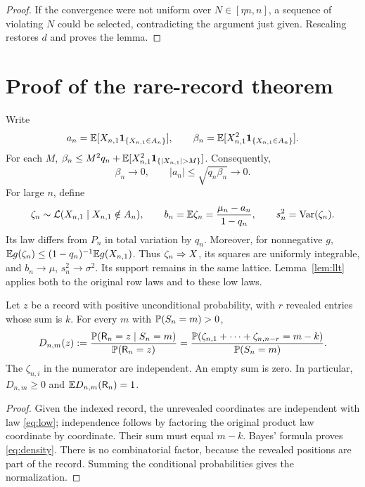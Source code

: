 \begin{proof}
If the convergence were not uniform over $N\in[\eta n,n]$, a sequence of violating $N$ could be selected, contradicting the argument just given. Rescaling restores $d$ and proves the lemma.
\end{proof}

\section{Proof of the rare-record theorem}\label{sec:proof}
Write
\begin{equation}\label{eq:tailmoments}
 a_n=\mathbb E[X_{n,1}\mathbf 1_{\{X_{n,1}\in A_n\}}],\qquad
 \beta_n=\mathbb E[X_{n,1}^2\mathbf 1_{\{X_{n,1}\in A_n\}}].
\end{equation}
For each $M$, $\beta_n\le M^2q_n+\E[X_{n,1}^2\ind_{\{|X_{n,1}|>M\}}]$. Consequently,
\begin{equation}\label{eq:betazero}
 \beta_n\to0,\qquad |a_n|\le\sqrt{q_n\beta_n}\to0.
\end{equation}
For large $n$, define
\begin{equation}\label{eq:low}
 \zeta_n\sim\mathcal L(X_{n,1}\mid X_{n,1}\notin A_n),\qquad
 b_n=\mathbb E\zeta_n=\frac{\mu_n-a_n}{1-q_n},\qquad
 s_n^2=\operatorname{Var}(\zeta_n).
\end{equation}
Its law differs from $P_n$ in total variation by $q_n$. Moreover, for nonnegative $g$,
$\mathbb E g(\zeta_n)\le(1-q_n)^{-1}\mathbb E g(X_{n,1})$. Thus $\zeta_n\mathrel{\Rightarrow} X$, its squares are uniformly integrable, and $b_n\to\mu$, $s_n^2\to\sigma^2$. Its support remains in the same lattice. Lemma~\ref{lem:llt} applies both to the original row laws and to these low laws.

\begin{lemma}\label{lem:density}
Let $z$ be a record with positive unconditional probability, with $r$ revealed entries whose sum is $k$. For every $m$ with $\mathbb P(S_n=m)>0$,
\begin{equation}\label{eq:density}
 D_{n,m}(z):=\frac{\mathbb P(\mathsf R_n=z\mid S_n=m)}{\mathbb P(\mathsf R_n=z)}
 =\frac{\mathbb P(\zeta_{n,1}+\cdots+\zeta_{n,n-r}=m-k)}{\mathbb P(S_n=m)}.
\end{equation}
The $\zeta_{n,i}$ in the numerator are independent. An empty sum is zero. In particular, $D_{n,m}\ge0$ and $\mathbb E D_{n,m}(\mathsf R_n)=1$.
\end{lemma}
\begin{proof}
Given the indexed record, the unrevealed coordinates are independent with law \eqref{eq:low}; independence follows by factoring the original product law coordinate by coordinate. Their sum must equal $m-k$. Bayes' formula proves \eqref{eq:density}. There is no combinatorial factor, because the revealed positions are part of the record. Summing the conditional probabilities gives the normalization.
\end{proof}

